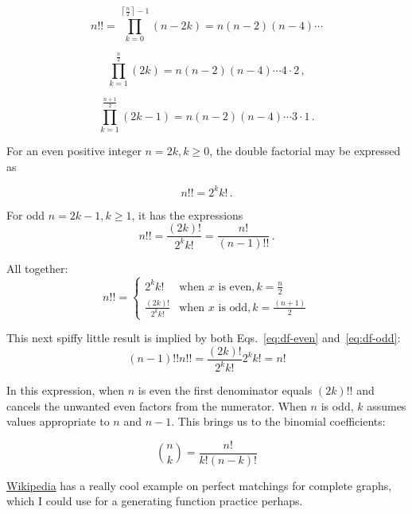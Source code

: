 \documentclass{article}
\begin{document}
\begin{equation}
  n!! = \prod_{k=0}^{\left\lceil\frac{n}{2}\right\rceil - 1} (n-2k) = n (n-2) (n-4) \cdots
\end{equation}

\begin{equation}
  \prod_{k=1}^\frac{n}{2} (2k) = n(n-2)(n-4)\cdots 4\cdot 2\,,
\end{equation}

\begin{equation}
  \prod_{k=1}^\frac{n+1}{2} (2k-1) = n(n-2)(n-4)\cdots 3\cdot 1 \,.
\end{equation}

For an even positive integer $n = 2k, k \geq 0$, the double factorial may be expressed as

\begin{equation}\label{eq:df-even}
{\displaystyle n!!=2^{k}k!\,.}
\end{equation}

For odd $n = 2k - 1, k \geq 1$, it has the expressions
\begin{equation}\label{eq:df-odd}
{\displaystyle n!!={\frac {(2k)!}{2^{k}k!}}={\frac {n!}{(n-1)!!}}\,.}
\end{equation}

All together:
\begin{equation}
n!! = \begin{cases}
  2^kk! & \text{when } x \text{ is even}, k = \frac{n}{2} \\
  \frac{(2k)!}{2^kk!} & \text{when } x \text{ is odd}, k = \frac{(n+1)}{2}
\end{cases}
\end{equation}


This next spiffy little result is implied by both
Eqs.~\ref{eq:df-even} and~\ref{eq:df-odd}:
\begin{equation}
  (n-1)!!n!! = \frac{(2k)!}{2^kk!}2^kk! = n!
\end{equation}

In this expression, when $n$ is even the first denominator equals $(2k)!!$
and cancels the unwanted even factors from the numerator. When $n$ is odd,
$k$ assumes values appropriate to $n$ and $n-1$. This brings us to the binomial
coefficients:

\[
  \binom{n}{k} = \frac{n!}{k!(n-k)!}
\]

\href{https://en.wikipedia.org/wiki/Double\_factorial}{Wikipedia} has a
really cool example on perfect matchings for complete graphs, which I could use
for a generating function practice perhaps.
\end{document}

